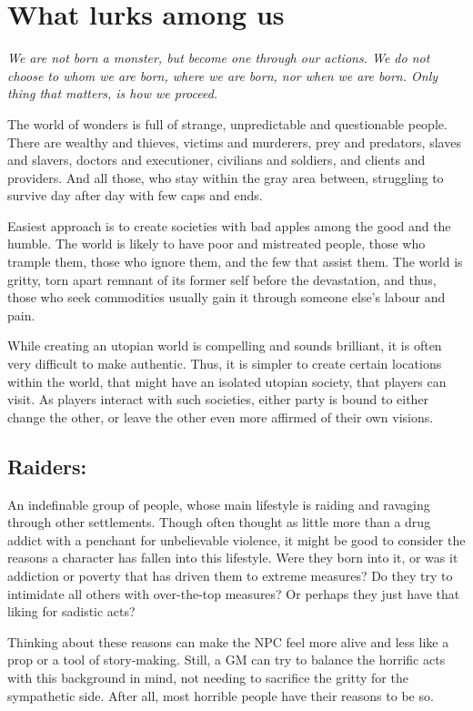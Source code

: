 \documentclass[11pt,a4paper,twocolumn]{book}
\begin{document}
    \section*{What lurks among us}
    \textit{We are not born a monster, but become one through our actions. We do not choose to whom we are born, where we are born, nor when we are born. Only thing that matters, is how we proceed.}
    
    \bigskip
    
    The world of wonders is full of strange, unpredictable and questionable people. There are wealthy and thieves, victims and murderers, prey and predators, slaves and slavers, doctors and executioner, civilians and soldiers, and clients and providers. And all those, who stay within the gray area between, struggling to survive day after day with few caps and ends. 
    
    Easiest approach is to create societies with bad apples among the good and the humble. The world is likely to have poor and mistreated people, those who trample them, those who ignore them, and the few that assist them. The world is gritty, torn apart remnant of its former self before the devastation, and thus, those who seek commodities usually gain it through someone else's labour and pain.
    
    While creating an utopian world is compelling and sounds brilliant, it is often very difficult to make authentic. Thus, it is simpler to create certain locations within the world, that might have an isolated utopian society, that players can visit. As players interact with such societies, either party is bound to either change the other, or leave the other even more affirmed of their own visions. 
    
    \subsection*{Raiders:}
    An indefinable group of people, whose main lifestyle is raiding and ravaging through other settlements. Though often thought as little more than a drug addict with a penchant for unbelievable violence, it might be good to consider the reasons a character has fallen into this lifestyle. Were they born into it, or was it addiction or poverty that has driven them to extreme measures? Do they try to intimidate all others with over-the-top measures? Or perhaps they just have that liking for sadistic acts?
    
    Thinking about these reasons can make the NPC feel more alive and less like a prop or a tool of story-making. Still, a GM can try to balance the horrific acts with this background in mind, not needing to sacrifice the gritty for the sympathetic side. After all, most horrible people have their reasons to be so.
    
\end{document}
